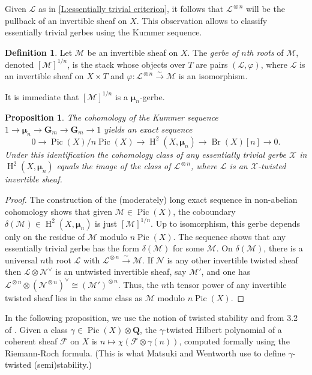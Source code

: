 \documentclass[11pt]{amsart}
\newcommand{\field}[1]{\mathbf #1}
\newcommand{\ms}[1]{\mathscr #1}
\newcommand{\Q}{\field Q}
\newcommand{\simto}{\stackrel{\sim}{\to}}
\renewcommand{\phi}{\varphi}
\DeclareMathOperator{\Pic}{Pic}
\newcommand{\m}{\boldsymbol{\mu}}
\newcommand{\G}{\field G} %
\renewcommand{\H}{\operatorname{H}}
\renewcommand{\[}{[\!\hspace{0.03em}[}
\renewcommand{\]}{]\!\hspace{0.03em}]}
\renewcommand{\(}{(\!\hspace{0.03em}(}
\renewcommand{\)}{)\!\hspace{0.03em})}
\DeclareMathOperator*{\tensor}{\otimes}
\DeclareMathOperator{\Br}{\operatorname{Br}}
\newtheorem{prop}[lem]{Proposition}
\theoremstyle{definition}
\newtheorem{defn}[lem]{Definition}
\theoremstyle{remark}
\begin{document}
Given $\ms L$ as in \ref{L:essentially trivial criterion}, it follows that $\ms L^{\tensor n}$ will be the pullback of 
an invertible sheaf on $X$.  This observation allows to classify essentially trivial gerbes using the Kummer sequence.

\begin{defn}\label{D:gerbe of nth roots}  Let $\ms M$ be an 
invertible sheaf on $X$.  The \emph{gerbe of $n$th roots\/} of $\ms 
M$, denoted $[\ms M]^{1/n}$, is the stack whose objects over $T$ are 
pairs $(\ms L,\phi)$, where $\ms L$ is an invertible sheaf on 
$X\times T$ and $\phi:\ms L^{\tensor n}\simto\ms M$ is an isomorphism.
\end{defn}
It is immediate that $[\ms M]^{1/n}$ is a $\m_{n}$-gerbe.

\begin{prop}\label{P:essentially trivial} The cohomology of the Kummer sequence 
$1\to\m_{n}\to\G_{m}\to\G_{m}\to 1$ yields an exact sequence
$$0\to\Pic(X)/n\Pic(X)\to\H^{2}(X,\m_{n})\to\Br(X)[n]\to 0.$$
Under this identification the cohomology class 
of any essentially trivial gerbe $\ms X$ in $\H^{2}(X,\m_{n})$ equals the image of the class of 
$\ms L^{\tensor n}$, where $\ms L$ is an $\ms X$-twisted invertible sheaf.
\end{prop}
\begin{proof} The construction of the (moderately) long exact sequence 
in non-abelian cohomology shows that given $\ms M\in\Pic(X)$, the 
coboundary $\delta(\ms M)\in\H^{2}(X,\m_{n})$ is just $[\ms M]^{1/n}$.
Up to isomorphism, this gerbe depends 
only on the residue of $\ms M$ modulo $n\Pic(X)$.  The sequence shows 
that any essentially trivial gerbe has the form $\delta(\ms M)$ for some 
$\ms M$.  On $\delta(\ms M)$, there is a universal $n$th root $\ms L$ 
with $\ms L^{\tensor n}\simto\ms M$.  If $\ms N$ is any other 
invertible twisted sheaf then $\ms L\tensor\ms N^{\vee}$ is an 
untwisted invertible sheaf, say $\ms M'$, and one has $\ms L^{\tensor 
n}\tensor(\ms N^{\tensor n})^{\vee}\cong(\ms M')^{\tensor n}$.  Thus, 
the $n$th tensor power of any invertible twisted sheaf lies in the 
same class as $\ms M$ modulo $n\Pic(X)$.
\end{proof}

In the following proposition, we use the notion of twisted stability and from 3.2 of \cite{matsuki-wentworth}.  
Given a class $\gamma\in\Pic(X)\tensor\Q$, the $\gamma$-twisted Hilbert polynomial of a coherent sheaf $\ms F$ on $X$ is $n\mapsto\chi(\ms F\tensor\gamma(n))$, computed formally using the Riemann-Roch formula.  (This is what Matsuki and Wentworth use to define $\gamma$-twisted (semi)stability.)
\end{document}
